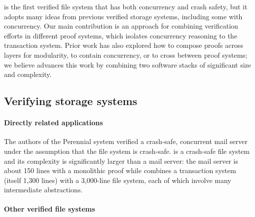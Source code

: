 \sys is the first verified file system that has both concurrency and crash
safety, but it adopts many ideas from previous verified storage systems,
including some with concurrency. Our main contribution is an approach for
combining verification efforts in different proof systems, which isolates
concurrency reasoning to the transaction system. Prior work has also explored
how to compose proofs across layers for modularity, to contain concurrency, or
to cross between proof systems; we believe \sys advances this work by combining
two software stacks of significant size and complexity.

\subsection{Verifying storage systems}

\paragraph{Directly related applications}  The authors of the
Perennial system verified a crash-safe, concurrent mail server under
the assumption that the file system is crash-safe. \sys is a
crash-safe file system and its complexity is significantly larger than
a mail server: the mail server is about 150 lines with a monolithic
proof while \sys combines a transaction system (itself 1,300 lines) with
a 3,000-line file system, each of which involve many intermediate
abstractions.


\paragraph{Other verified file systems}



